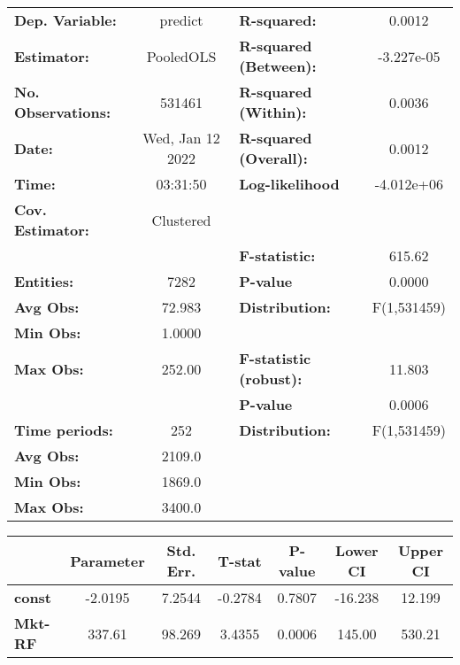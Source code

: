 \begin{center}
\begin{tabular}{lclc}
\toprule
\textbf{Dep. Variable:}    &      predict       & \textbf{  R-squared:         }   &      0.0012      \\
\textbf{Estimator:}        &     PooledOLS      & \textbf{  R-squared (Between):}  &    -3.227e-05    \\
\textbf{No. Observations:} &       531461       & \textbf{  R-squared (Within):}   &      0.0036      \\
\textbf{Date:}             &  Wed, Jan 12 2022  & \textbf{  R-squared (Overall):}  &      0.0012      \\
\textbf{Time:}             &      03:31:50      & \textbf{  Log-likelihood     }   &    -4.012e+06    \\
\textbf{Cov. Estimator:}   &     Clustered      & \textbf{                     }   &                  \\
\textbf{}                  &                    & \textbf{  F-statistic:       }   &      615.62      \\
\textbf{Entities:}         &        7282        & \textbf{  P-value            }   &      0.0000      \\
\textbf{Avg Obs:}          &       72.983       & \textbf{  Distribution:      }   &   F(1,531459)    \\
\textbf{Min Obs:}          &       1.0000       & \textbf{                     }   &                  \\
\textbf{Max Obs:}          &       252.00       & \textbf{  F-statistic (robust):} &      11.803      \\
\textbf{}                  &                    & \textbf{  P-value            }   &      0.0006      \\
\textbf{Time periods:}     &        252         & \textbf{  Distribution:      }   &   F(1,531459)    \\
\textbf{Avg Obs:}          &       2109.0       & \textbf{                     }   &                  \\
\textbf{Min Obs:}          &       1869.0       & \textbf{                     }   &                  \\
\textbf{Max Obs:}          &       3400.0       & \textbf{                     }   &                  \\
\bottomrule
\end{tabular}
\begin{tabular}{lcccccc}
                & \textbf{Parameter} & \textbf{Std. Err.} & \textbf{T-stat} & \textbf{P-value} & \textbf{Lower CI} & \textbf{Upper CI}  \\
\midrule
\textbf{const}  &      -2.0195       &       7.2544       &     -0.2784     &      0.7807      &      -16.238      &       12.199       \\
\textbf{Mkt-RF} &       337.61       &       98.269       &      3.4355     &      0.0006      &       145.00      &       530.21       \\
\bottomrule
\end{tabular}
\end{center}
